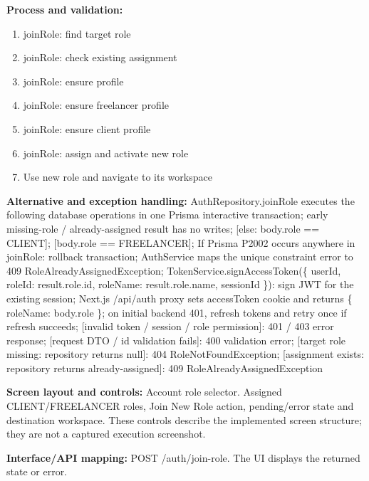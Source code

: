 \textbf{Process and validation:}
\begin{enumerate}
\item join\allowbreak{}Role: find target role
\item join\allowbreak{}Role: check existing assignment
\item join\allowbreak{}Role: ensure profile
\item join\allowbreak{}Role: ensure freelancer profile
\item join\allowbreak{}Role: ensure client profile
\item join\allowbreak{}Role: assign and activate new role
\item Use new role and navigate to its workspace
\end{enumerate}
\textbf{Alternative and exception handling:} Auth\allowbreak{}Repository.join\allowbreak{}Role executes the following database operations in one Prisma interactive transaction; early missing-role /\allowbreak{} already-assigned result has no writes; [else: body.role =\allowbreak{}=\allowbreak{} CLIENT]; [body.role =\allowbreak{}=\allowbreak{} FREELANCER]; If Prisma P2002 occurs anywhere in join\allowbreak{}Role: rollback transaction; Auth\allowbreak{}Service maps the unique constraint error to 409 Role\allowbreak{}Already\allowbreak{}Assigned\allowbreak{}Exception; Token\allowbreak{}Service.sign\allowbreak{}Access\allowbreak{}Token(\{ user\allowbreak{}Id, role\allowbreak{}Id: result.role.id, role\allowbreak{}Name: result.role.name, session\allowbreak{}Id \}): sign JWT for the existing session; Next.js /\allowbreak{}api/\allowbreak{}auth proxy sets access\allowbreak{}Token cookie and returns \{ role\allowbreak{}Name: body.role \}; on initial backend 401, refresh tokens and retry once if refresh succeeds; [invalid token /\allowbreak{} session /\allowbreak{} role permission]: 401 /\allowbreak{} 403 error response; [request DTO /\allowbreak{} id validation fails]: 400 validation error; [target role missing: repository returns null]: 404 Role\allowbreak{}Not\allowbreak{}Found\allowbreak{}Exception; [assignment exists: repository returns already-assigned]: 409 Role\allowbreak{}Already\allowbreak{}Assigned\allowbreak{}Exception

\textbf{Screen layout and controls:} Account role selector. Assigned CLIENT/\allowbreak{}FREELANCER roles, Join New Role action, pending/\allowbreak{}error state and destination workspace. These controls describe the implemented screen structure; they are not a captured execution screenshot.

\textbf{Interface/\allowbreak{}API mapping:} POST /\allowbreak{}auth/\allowbreak{}join-role. The UI displays the returned state or error.

\endgroup
